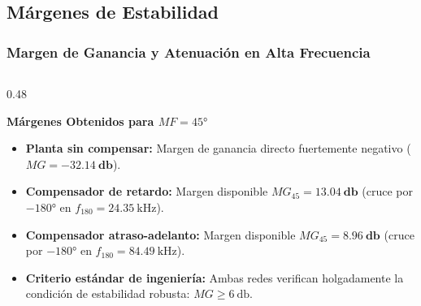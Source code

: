 \documentclass[aspectratio=169, 10pt]{beamer}
\begin{document}
\subsection{Márgenes de Estabilidad}
\begin{frame}
  \frametitle{Margen de Ganancia y Atenuación en Alta Frecuencia}

  \begin{columns}[t, onlytextwidth]
    \begin{column}{0.48\textwidth}
      \begin{tarjeta}
        {\fontsize{9pt}{11pt}\selectfont \textbf{\color{NavyDark} Márgenes Obtenidos para $MF = \ang{45}$}}\\[2pt]
        {\fontsize{8pt}{10pt}\selectfont
        \begin{itemize}\setlength{\itemsep}{2.5pt}
          \item \textbf{Planta sin compensar:}
          Margen de ganancia directo fuertemente negativo ($MG = \mathbf{-32.14\ \unit{\decibel}}$).
          \item \textbf{Compensador de retardo:}
          Margen disponible $MG_{45} = \mathbf{\qty{13.04}{\decibel}}$ (cruce por $\ang{-180}$ en $f_{180} = \qty{24.35}{\kilo\hertz}$).
          \item \textbf{Compensador atraso-adelanto:}
          Margen disponible $MG_{45} = \mathbf{\qty{8.96}{\decibel}}$ (cruce por $\ang{-180}$ en $f_{180} = \qty{84.49}{\kilo\hertz}$).
          \item \textbf{Criterio estándar de ingeniería:}
          Ambas redes verifican holgadamente la condición de estabilidad robusta: $MG \ge \qty{6}{\decibel}$.
        \end{itemize}
        }
      \end{tarjeta}
    \end{column}


\end{columns}
\end{frame}
\end{document}

